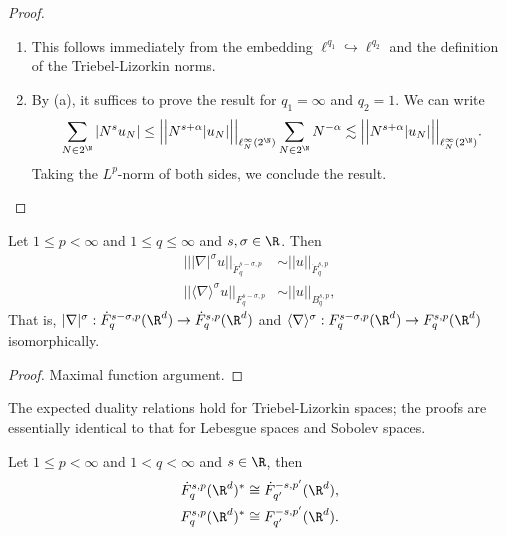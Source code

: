 \begin{proof}
\leavevmode
\begin{enumerate}
	\item This follows immediately from the embedding $\ell^{q_1} \hookrightarrow \ell^{q_2}$ and the definition of the Triebel-Lizorkin norms. 
	
	\item By (a), it suffices to prove the result for $q_1 = \infty$ and $q_2 = 1$. We can write
		\begin{align*}
			\sum_{N \in 2^\N} |N^s u_N| \leq \Big|\Big| N^{s + \alpha} |u_N| \Big|\Big|_{\ell^\infty_N (2^\N)} \sum_{N \in 2^\N} N^{-\alpha} \lesssim \Big|\Big| N^{s + \alpha} |u_N| \Big|\Big|_{\ell^\infty_N (2^\N)}.
		\end{align*}
		Taking the $L^p$-norm of both sides, we conclude the result. 
\end{enumerate}
\end{proof}

\begin{proposition}
	Let $1 \leq p < \infty$ and $1 \leq q \leq \infty$ and $s, \sigma \in \R$. Then 
		\begin{align*}
			|||\nabla|^\sigma u||_{\dot F^{s - \sigma, p}_q}
				&\sim ||u||_{\dot F^{s, p}_q}\\
			 || \langle \nabla \rangle^\sigma u ||_{F^{s - \sigma, p}_q} 
			 	&\sim ||u||_{B^{s, p}_q} ,
		\end{align*}	 
	That is, $|\nabla|^\sigma : 	\dot F^{s - \sigma, p}_q (\R^d) \to \dot F^{s, p}_q (\R^d)$ and $\langle \nabla \rangle^\sigma : 	F^{s - \sigma, p}_q (\R^d) \to F^{s, p}_q (\R^d)$ isomorphically. 
\end{proposition}

\begin{proof}
	Maximal function argument. 
\end{proof}

The expected duality relations hold for Triebel-Lizorkin spaces; the proofs are essentially identical to that for Lebesgue spaces and Sobolev spaces.

\begin{theorem}[Duality]
	Let $1 \leq p < \infty$ and $1 < q < \infty$ and $s \in \R$, then 
		\begin{align*}
			\dot F^{s, p}_{q} (\R^d)^* 
				&\cong \dot F^{-s, p'}_{q'} (\R^d), \\
			F^{s, p}_{q} (\R^d)^* 
				&\cong  F^{-s, p'}_{q'} (\R^d).
		\end{align*}
\end{theorem}

